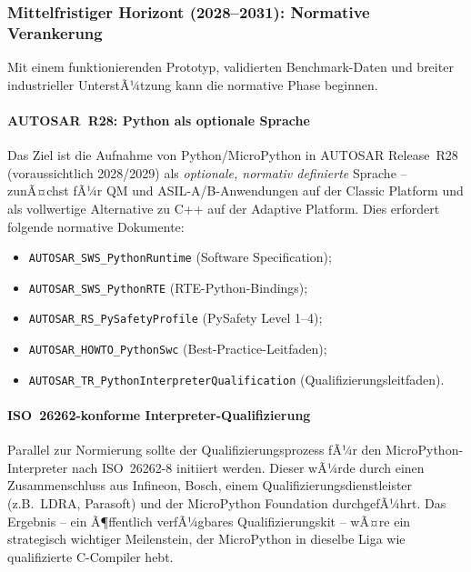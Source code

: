 ﻿\documentclass[12pt,a4paper,twoside]{article}
\begin{document}
\subsubsection{Mittelfristiger Horizont (2028--2031): Normative Verankerung}

Mit einem funktionierenden Prototyp, validierten Benchmark-Daten und
breiter industrieller UnterstÃ¼tzung kann die normative Phase beginnen.

\paragraph{AUTOSAR~R28: Python als optionale Sprache}
Das Ziel ist die Aufnahme von Python/MicroPython in AUTOSAR Release~R28
(voraussichtlich 2028/2029) als \emph{optionale, normativ definierte}
Sprache -- zunÃ¤chst fÃ¼r QM und ASIL-A/B-Anwendungen auf der Classic Platform
und als vollwertige Alternative zu C++ auf der Adaptive Platform.
Dies erfordert folgende normative Dokumente:
\begin{itemize}
  \item \texttt{AUTOSAR\_SWS\_PythonRuntime} (Software Specification);
  \item \texttt{AUTOSAR\_SWS\_PythonRTE} (RTE-Python-Bindings);
  \item \texttt{AUTOSAR\_RS\_PySafetyProfile} (PySafety Level 1--4);
  \item \texttt{AUTOSAR\_HOWTO\_PythonSwc} (Best-Practice-Leitfaden);
  \item \texttt{AUTOSAR\_TR\_PythonInterpreterQualification} (Qualifizierungsleitfaden).
\end{itemize}

\paragraph{ISO~26262-konforme Interpreter-Qualifizierung}
Parallel zur Normierung sollte der Qualifizierungsprozess fÃ¼r den
MicroPython-Interpreter nach ISO~26262-8 initiiert werden.
Dieser wÃ¼rde durch einen Zusammenschluss aus Infineon, Bosch, einem
Qualifizierungsdienstleister (z.B.\ LDRA, Parasoft) und der
MicroPython Foundation durchgefÃ¼hrt.
Das Ergebnis -- ein Ã¶ffentlich verfÃ¼gbares Qualifizierungskit --
wÃ¤re ein strategisch wichtiger Meilenstein, der MicroPython in
dieselbe Liga wie qualifizierte C-Compiler hebt.
\end{document}
